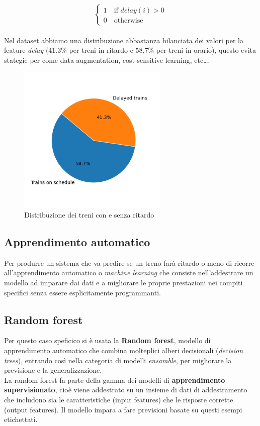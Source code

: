 \documentclass[italian,12pt,a4paper]{article}
\begin{document}
			\begin{equation*}
				\begin{cases}
					1 \quad \text{if } delay(i) > 0  \\
					0 \quad \text{otherwise}
				\end{cases}
			\end{equation*}
			\linebreak
			\\
			Nel dataset abbiamo una distribuzione abbastanza bilanciata dei valori per la feature \textit{delay} ($41.3\%$ per treni in ritardo e $58.7\%$ per treni in orario), questo evita stategie per come data augmentation, cost-sensitive learning, etc\dots.
			
			\begin{figure}[!h]
				\centering
				\includegraphics[width=270px]{img/delay_graph}
				\caption{Distribuzione dei treni con e senza ritardo}
			\end{figure}
			
	\subsection{Apprendimento automatico}
	Per produrre un sistema che va predire se un treno farà ritardo o meno di ricorre all'apprendimento automatico o \textit{machine learning} che consiste nell'addestrare un modello ad imparare dai dati e a migliorare le proprie prestazioni nei compiti specifici senza essere esplicitamente programmanti.
	
	\subsection{Random forest}
	Per questo caso speficico si è usata la \textbf{Random forest}, modello di apprendimento automatico che combina molteplici alberi decisionali (\textit{decision trees}), entrando così nella categoria di modelli \textit{ensamble}, per migliorare la previsione e la generalizzazione.\\
	La random forest fa parte della gamma dei modelli di \textbf{apprendimento supervisionato}, cioè viene addestrato su un insieme di dati di addestramento che includono sia le caratteristiche (input features) che le risposte corrette (output features). 
	Il modello impara a fare previsioni basate su questi esempi etichettati.
		
\end{document}
